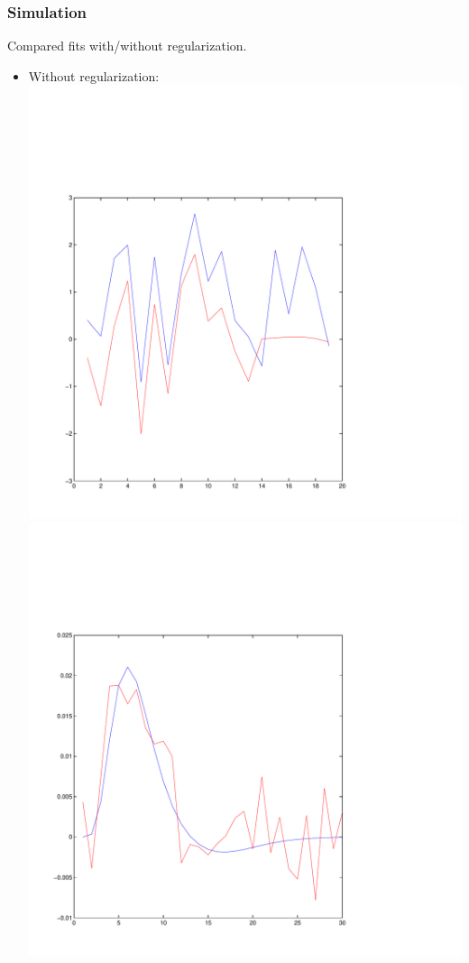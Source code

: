 \documentclass{beamer}
\begin{document}
\begin{frame}
\frametitle{Simulation}
Compared fits with/without regularization.
\begin{itemize}
\item Without regularization:
\includegraphics[scale=0.1]{ex2_test1a.pdf}
\includegraphics[scale=0.1]{ex2_test1b.pdf}

\end{itemize}
\end{frame}
\end{document}
